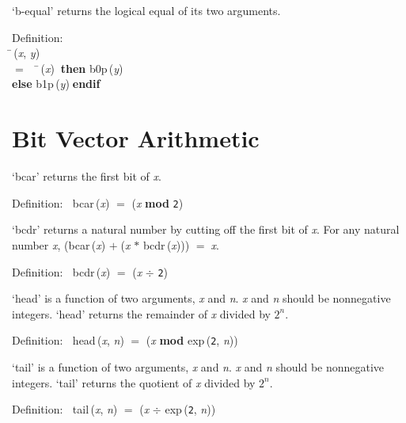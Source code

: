  `b-equal' returns the logical equal of its two arguments.
\begin{tabbing}{\sc Definition}: \\  
\=\,({\it{x\/}}, {\it{y\/}}) \\ 
$=$$\;\;\;\;$\=\,({\it{x\/}})$\;\;${\bf then }{\rm{b0p}}\,({\it{y\/}}) \\ 
{\bf else }{\rm{b1p}}\,({\it{y\/}})$\;${\bf  endif}\-\-
\end{tabbing}

 \section{Bit Vector Arithmetic}

 `bcar' returns the first bit of {\it{x\/}}.
\begin{tabbing}{\sc Definition}:$\;\;$
{\rm{bcar}}\,({\it{x\/}}) $=$ ({\it{x\/}} ${}${\bf{mod}}${}$ {\tt{2}})
\end{tabbing}

 `bcdr' returns a natural number by cutting off the first bit of {\it{x\/}}.
 For any natural number {\it{x\/}}, ({\rm{bcar}}\,({\it{x\/}}) $+$$\;$({\it{x\/}} $*$ {\rm{bcdr}}\,({\it{x\/}}))) $=$$\;${\it{x\/}}.

\begin{tabbing}{\sc Definition}:$\;\;$
{\rm{bcdr}}\,({\it{x\/}}) $=$ ({\it{x\/}} $\div$ {\tt{2}})
\end{tabbing}

 `head' is a function of two arguments, {\it{x\/}} and {\it{n\/}}.  {\it{x\/}} and {\it{n\/}} should be
 nonnegative integers.  `head' returns the remainder of {\it{x\/}} divided by
 $2^n$.
\begin{tabbing}{\sc Definition}:$\;\;$
{\rm{head}}\,({\it{x\/}}, {\it{n\/}}) $=$ ({\it{x\/}} ${}${\bf{mod}}${}$ {\rm{exp}}\,({\tt{2}}, {\it{n\/}}))
\end{tabbing}

 `tail' is a function of two arguments, {\it{x\/}} and {\it{n\/}}.  {\it{x\/}} and {\it{n\/}} should be
 nonnegative integers.  `tail' returns the quotient of {\it{x\/}} divided by
 $2^n$.
\begin{tabbing}{\sc Definition}:$\;\;$
{\rm{tail}}\,({\it{x\/}}, {\it{n\/}}) $=$ ({\it{x\/}} $\div$ {\rm{exp}}\,({\tt{2}}, {\it{n\/}}))
\end{tabbing}

